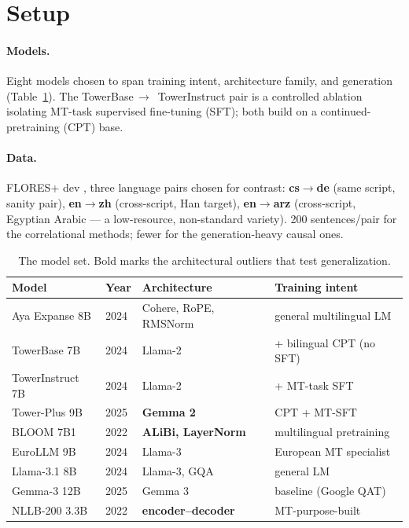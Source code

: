 \documentclass[11pt]{article}
\begin{document}
\section{Setup}

\paragraph{Models.} Eight models chosen to span training intent, architecture
family, and generation (Table~\ref{tab:models}). The TowerBase\,$\rightarrow$\,
TowerInstruct pair is a controlled ablation isolating MT-task supervised
fine-tuning (SFT); both build on a continued-pretraining (CPT) base.

\paragraph{Data.} FLORES+ dev \citep{nllb2022}, three language pairs chosen for contrast:
\textbf{cs$\rightarrow$de} (same script, sanity pair), \textbf{en$\rightarrow$zh}
(cross-script, Han target), \textbf{en$\rightarrow$arz} (cross-script, Egyptian
Arabic --- a low-resource, non-standard variety). 200 sentences/pair for the
correlational methods; fewer for the generation-heavy causal ones.

\begin{table}[t]\centering\small
\begin{tabular}{llll}
\toprule
Model & Year & Architecture & Training intent \\
\midrule
Aya Expanse 8B \citep{dang2024aya} & 2024 & Cohere, RoPE, RMSNorm & general multilingual LM \\
TowerBase 7B \citep{alves2024tower} & 2024 & Llama-2 & + bilingual CPT (no SFT) \\
TowerInstruct 7B \citep{alves2024tower} & 2024 & Llama-2 & + MT-task SFT \\
Tower-Plus 9B \citep{rei2025towerplus} & 2025 & \textbf{Gemma 2}~\citep{gemmateam2024gemma2} & CPT + MT-SFT \\
BLOOM 7B1 \citep{lescao2022bloom} & 2022 & \textbf{ALiBi, LayerNorm} & multilingual pretraining \\
EuroLLM 9B \citep{martins2024eurollm} & 2024 & Llama-3 & European MT specialist \\
Llama-3.1 8B \citep{dubey2024llama3} & 2024 & Llama-3, GQA & general LM \\
Gemma-3 12B \citep{gemmateam2025gemma3} & 2025 & Gemma 3 & baseline (Google QAT) \\
\midrule
NLLB-200 3.3B \citep{nllb2022} & 2022 & \textbf{encoder--decoder} & MT-purpose-built \\
\bottomrule
\end{tabular}
\caption{The model set. Bold marks the architectural outliers that test
generalization.}
\label{tab:models}
\end{table}
\end{document}
